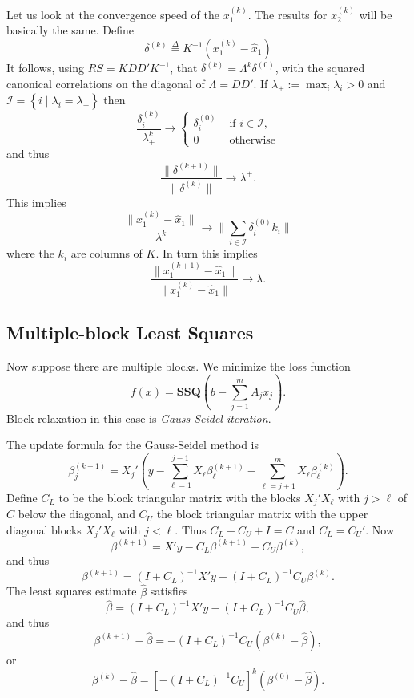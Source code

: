 \documentclass[
  12pt,
]{book}
\begin{document}
Let us look at the convergence speed of the \(x_1^{(k)}\). The results for \(x_2^{(k)}\) will be basically the same. Define
\[
\delta^{(k)}\mathop{=}\limits^{\Delta}K^{-1}(x_1^{(k)}-\hat x_1^{\ })
\]
It follows, using \(RS=KDD'K^{-1}\), that \(\delta^{(k)}=\Lambda^k\delta^{(0)}\),
with the squared canonical correlations on the diagonal of \(\Lambda=DD'.\)
If \(\lambda_+:=\max_i\lambda_i>0\)
and \(\mathcal{I}=\left\{i\mid\lambda_i=\lambda_+\right\}\) then
\[
\frac{\delta^{(k)}_i}{\lambda_+^k}\rightarrow\begin{cases}
\delta^{(0)}_i&\text{ if }i\in\mathcal{I},\\
0&\text{ otherwise}
\end{cases}
\]
and thus
\[
\frac{\|\delta^{(k+1)}\|}{\|\delta^{(k)}\|}\rightarrow\lambda^+.
\]
This implies
\[
\frac{\|x_1^{(k)}-\hat x_1^{\ }\|}{\lambda^k}\rightarrow\|\sum_{i\in\mathcal{I}}\delta_i^{(0)}k_i^{\ }\|
\]
where the \(k_i\) are columns of \(K\). In turn this implies
\[
\frac{\|x_1^{(k+1)}-\hat x_1^{\ }\|}{\|x_1^{(k)}-\hat x_1^{\ }\|}\rightarrow\lambda.
\]

\hypertarget{blockrelaxation:firstexamples:multipleblockleastsquares}{%
\subsection{Multiple-block Least Squares}\label{blockrelaxation:firstexamples:multipleblockleastsquares}}

Now suppose there are multiple blocks. We minimize the loss function
\begin{equation}
f(x)=\mathbf{SSQ}(b-\sum_{j=1}^m A_jx_j).
\end{equation}
Block relaxation in this case is \emph{Gauss-Seidel iteration}.

The update formula for the Gauss-Seidel method is
\[
\beta_j^{(k+1)}=X_j'\left(y-\sum_{\ell=1}^{j-1}X_\ell^{\ }\beta_\ell^{(k+1)}-\sum_{\ell=j+1}^{m}X_\ell^{\ }\beta_\ell^{(k)}\right).
\]
Define \(C_L\) to be the block triangular matrix with the blocks \(X_j'X_\ell^{\ }\) with \(j>\ell\) of \(C\) below the diagonal, and \(C_U\) the block triangular matrix with the upper diagonal blocks \(X_j'X_\ell^{\ }\) with \(j<\ell\). Thus \(C_L+C_U+I=C\) and \(C_L=C_U'\). Now
\[
\beta^{(k+1)}=X'y-C_L\beta^{(k+1)}-C_U\beta^{(k)},
\]
and thus
\[
\beta^{(k+1)}=(I+C_L)^{-1}X'y-(I+C_L)^{-1}C_U\beta^{(k)}.
\]
The least squares estimate \(\hat\beta\) satisfies
\[
\hat\beta=(I+C_L)^{-1}X'y-(I+C_L)^{-1}C_U\hat\beta,
\]
and thus
\[
\beta^{(k+1)}-\hat\beta=-(I+C_L)^{-1}C_U(\beta^{(k)}-\hat\beta),
\]
or
\[
\beta^{(k)}-\hat\beta=\left[-(I+C_L)^{-1}C_U\right]^k(\beta^{(0)}-\hat\beta).
\]
\end{document}
